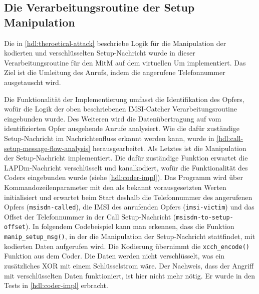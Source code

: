 \subsection{Die Verarbeitungsroutine der Setup Manipulation}
Die in \autoref{hdl:theroetical-attack} beschriebe Logik für die Manipulation der kodierten und verschlüsselten Setup-Nachricht wurde in dieser Verarbeitungsroutine für den \ac{MitM} auf dem virtuellen \ac{Um} implementiert. Das Ziel ist die Umleitung des Anrufs, indem die angerufene Telefonnummer ausgetauscht wird.

Die Funktionalität der Implementierung umfasst die Identifikation des Opfers, wofür die Logik der oben beschriebenen \ac{IMSI}-Catcher Verarbeitungsroutine eingebunden wurde. Des Weiteren wird die Datenübertragung auf vom identifizierten Opfer ausgehende Anrufe analysiert. Wie die dafür zuständige Setup-Nachricht im Nachrichtenfluss erkannt werden kann, wurde in \autoref{hdl:call-setup-message-flow-analysis} herausgearbeitet. Als Letztes ist die Manipulation der Setup-Nachricht implementiert. Die dafür zuständige Funktion erwartet die \ac{LAPDm}-Nachricht verschlüsselt und kanalkodiert, wofür die Funktionalität des Coders eingebunden wurde (siehe \autoref{hdl:coder-impl}). Das Programm wird über Kommandozeilenparameter mit den als bekannt vorausgesetzten Werten initialisiert und erwartet beim Start deshalb die Telefonnummer des angerufenen Opfers (\texttt{msisdn-called}), die \ac{IMSI} des anrufenden Opfers (\texttt{imsi-victim}) und das Offset der Telefonnummer in der Call Setup-Nachricht (\texttt{msisdn-to-setup-offset}). In folgendem Codebeispiel kann man erkennen, dass die Funktion \texttt{manip\_setup\_msg()}, in der die Manipulation der Setup-Nachricht stattfindet, mit kodierten Daten aufgerufen wird. Die Kodierung übernimmt die \texttt{xcch\_encode()} Funktion aus dem Coder. Die Daten werden nicht verschlüsselt, was ein zusätzliches \ac{XOR} mit einem Schlüsselstrom wäre. Der Nachweis, dass der Angriff mit verschlüsselten Daten funktioniert, ist hier nicht mehr nötig. Er wurde in den Tests in \autoref{hdl:coder-impl} erbracht.\\


